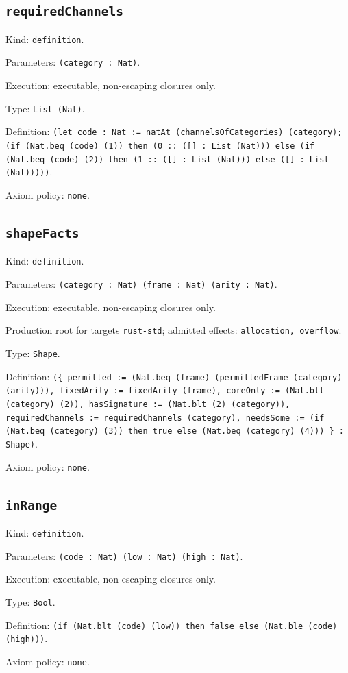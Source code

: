 \documentclass[11pt]{article}
\begin{document}
\subsection*{\texttt{requiredChannels}}
\noindent Kind: \texttt{definition}.\par
\noindent Parameters: \texttt{(category : Nat)}.\par
\noindent Execution: executable, non-escaping closures only.\par
\noindent Type: \texttt{List (Nat)}.\par
\noindent Definition: \texttt{(let code : Nat := natAt (channelsOfCategories) (category); (if (Nat.beq (code) (1)) then (0 :: ([] : List (Nat))) else (if (Nat.beq (code) (2)) then (1 :: ([] : List (Nat))) else ([] : List (Nat)))))}.\par
\noindent Axiom policy: \texttt{none}.\par
\subsection*{\texttt{shapeFacts}}
\noindent Kind: \texttt{definition}.\par
\noindent Parameters: \texttt{(category : Nat) (frame : Nat) (arity : Nat)}.\par
\noindent Execution: executable, non-escaping closures only.\par
\noindent Production root for targets \texttt{rust-std}; admitted effects: \texttt{allocation, overflow}.\par
\noindent Type: \texttt{Shape}.\par
\noindent Definition: \texttt{(\{ permitted := (Nat.beq (frame) (permittedFrame (category) (arity))), fixedArity := fixedArity (frame), coreOnly := (Nat.blt (category) (2)), hasSignature := (Nat.blt (2) (category)), requiredChannels := requiredChannels (category), needsSome := (if (Nat.beq (category) (3)) then true else (Nat.beq (category) (4))) \} : Shape)}.\par
\noindent Axiom policy: \texttt{none}.\par
\subsection*{\texttt{inRange}}
\noindent Kind: \texttt{definition}.\par
\noindent Parameters: \texttt{(code : Nat) (low : Nat) (high : Nat)}.\par
\noindent Execution: executable, non-escaping closures only.\par
\noindent Type: \texttt{Bool}.\par
\noindent Definition: \texttt{(if (Nat.blt (code) (low)) then false else (Nat.ble (code) (high)))}.\par
\noindent Axiom policy: \texttt{none}.\par
\end{document}
